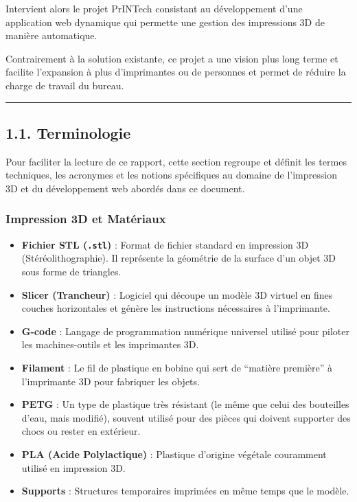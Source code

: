 Intervient alors le projet PrINTech consistant au développement d'une
application web dynamique qui permette une gestion des impressions 3D de
manière automatique.

Contrairement à la solution existante, ce projet a une vision plus long
terme et facilite l'expansion à plus d'imprimantes ou de personnes et
permet de réduire la charge de travail du bureau.

\begin{center}\rule{0.5\linewidth}{0.5pt}\end{center}

\newpage

\hypertarget{terminologie}{%
\subsection{1.1. Terminologie}\label{terminologie}}

Pour faciliter la lecture de ce rapport, cette section regroupe et
définit les termes techniques, les acronymes et les notions spécifiques
au domaine de l'impression 3D et du développement web abordés dans ce
document.

\hypertarget{impression-3d-et-matuxe9riaux}{%
\subsubsection{Impression 3D et
Matériaux}\label{impression-3d-et-matuxe9riaux}}

\begin{itemize}
\tightlist
\item
  \textbf{Fichier STL (\texttt{.stl})} : Format de fichier standard en
  impression 3D (Stéréolithographie). Il représente la géométrie de la
  surface d'un objet 3D sous forme de triangles.
\item
  \textbf{Slicer (Trancheur)} : Logiciel qui découpe un modèle 3D
  virtuel en fines couches horizontales et génère les instructions
  nécessaires à l'imprimante.
\item
  \textbf{G-code} : Langage de programmation numérique universel utilisé
  pour piloter les machines-outils et les imprimantes 3D.
\item
  \textbf{Filament} : Le fil de plastique en bobine qui sert de
  ``matière première'' à l'imprimante 3D pour fabriquer les objets.
\item
  \textbf{PETG} : Un type de plastique très résistant (le même que celui
  des bouteilles d'eau, mais modifié), souvent utilisé pour des pièces
  qui doivent supporter des chocs ou rester en extérieur.
\item
  \textbf{PLA (Acide Polylactique)} : Plastique d'origine végétale
  couramment utilisé en impression 3D.
\item
  \textbf{Supports} : Structures temporaires imprimées en même temps que
  le modèle.
\end{itemize}

